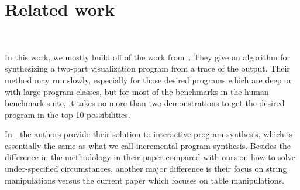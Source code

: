 \section{Related work}~\label{sec:related}

In this work, we mostly build off of the work from~\cite{DBLP:journals/pacmpl/WangFBCD20}. They give an algorithm for synthesizing a two-part visualization program from a trace of the output. Their method may run slowly, especially for those desired programs which are deep or with large program classes, but for most of the benchmarks in the human benchmark suite, it takes no more than two demonstrations to get the desired program in the top 10 possibilities.

In \citep{le2017interactive}, the authors provide their solution to interactive program synthesis, which is essentially the same as what we call incremental program synthesis. Besides the difference in the methodology in their paper compared with ours on how to solve under-specified circumstances, another major difference is their focus on string manipulations versus the current paper which focuses on table manipulations.